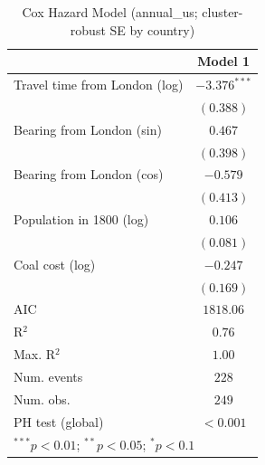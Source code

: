 
\begin{table}
\begin{center}
\begin{tabular}{l c}
\hline
 & Model 1 \\
\hline
Travel time from London (log) & $-3.376^{***}$ \\
 & $(0.388)$ \\
Bearing from London (sin) & $0.467$ \\
 & $(0.398)$ \\
Bearing from London (cos) & $-0.579$ \\
 & $(0.413)$ \\
Population in 1800 (log) & $0.106$ \\
 & $(0.081)$ \\
Coal cost (log) & $-0.247$ \\
 & $(0.169)$ \\
\hline
AIC              & $1818.06$ \\
R$^2$            & $0.76$ \\
Max. R$^2$       & $1.00$ \\
Num. events      & $228$ \\
Num. obs.        & $249$ \\
PH test (global) & $<0.001$ \\
\hline
\multicolumn{2}{l}{\scriptsize{$^{***}p<0.01$; $^{**}p<0.05$; $^{*}p<0.1$}}
\end{tabular}
\caption{Cox Hazard Model (annual\_us; cluster-robust SE by country)}
\label{tab:cox_serious_annual_us}
\end{center}
\end{table}
